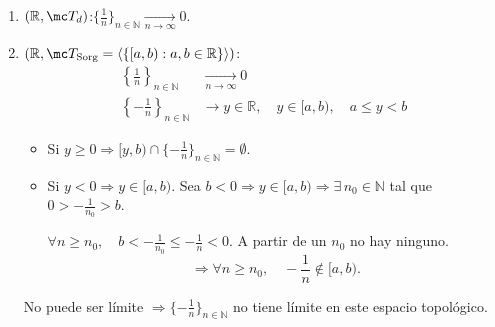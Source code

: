 \begin{ejems}
    \hfill
    \begin{enumerate}
        \item \((\mathbb{R}, \mc T_d)\):\quad \(\{\frac{1}{n}\}_{n \in \mathbb{N}} \xrightarrow[n \to \infty]{} 0\).
        
        \item \((\mathbb{R}, \mc T_{\text{Sorg}} = \langle \{ [a, b) : a, b \in \mathbb{R} \} \rangle)\):
        \begin{align*}            
            \left\{\frac{1}{n}\right\}_{n \in \mathbb{N}} & \xrightarrow[n \to \infty]{} 0  \\
            \left\{-\frac{1}{n}\right\}_{n \in \mathbb{N}} & \longrightarrow y \in \mathbb{R} , \quad y \in [a,b), \quad a \le y < b
                \end{align*}
        \begin{itemize}
            \item Si \(y \ge 0 \Rightarrow [y, b) \cap \{-\frac{1}{n}\}_{n \in \mathbb{N}} = \emptyset\).
            
            \item Si \(y < 0 \Rightarrow y \in [a,b)\). Sea \(b < 0 \Rightarrow y \in [a, b) \Rightarrow \exists \, n_0 \in \mathbb{N}\) tal que $0 > -\frac{1}{n_0} > b$.
            
            \begin{center}
            \end{center}
            \(\forall n \ge n_0, \quad b < - \frac{1}{n_0} \le - \frac{1}{n} < 0\). A partir de un \(n_0\) no hay ninguno.
            \[
                \Rightarrow \forall n \ge n_0, \quad -\frac{1}{n} \notin [a, b).
            \]
        \end{itemize}
        No puede ser límite \(\Rightarrow \{-\frac{1}{n}\}_{n \in \mathbb{N}}\) no tiene límite en este espacio topológico.
        

\end{enumerate}
\end{ejems}
